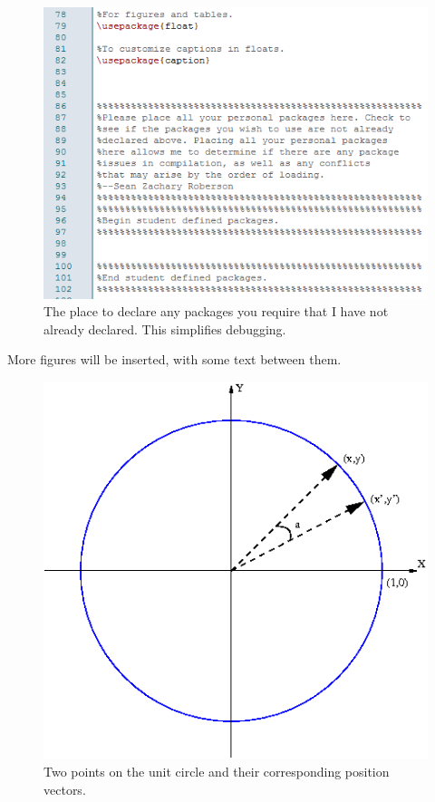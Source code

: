 \begin{figure}[!h]
	\centering
	\includegraphics[scale=0.95]{images/CustomPackage.png}
	\caption{The place to declare any packages you require that I have not already declared. This simplifies debugging.}
\end{figure}

More figures will be inserted, with some text between them.

\begin{figure}[!h]
	\centering
	\includegraphics[scale=0.85]{images/CartesianCoordinate.png}
	\caption{Two points on the unit circle and their corresponding position vectors.}
\end{figure}

